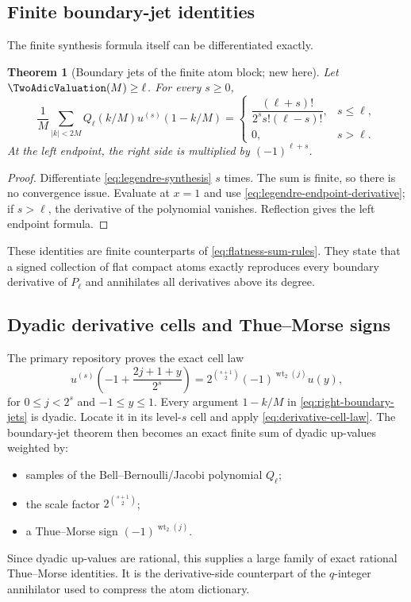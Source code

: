 \documentclass[11pt,oneside]{article}
\numberwithin{equation}{section}
\newtheorem{theorem}{Theorem}[section]
\theoremstyle{definition}
\theoremstyle{remark}
\begin{document}
\subsection{Finite boundary-jet identities}

The finite synthesis formula itself can be differentiated exactly.

\begin{theorem}[Boundary jets of the finite atom block; new here]
\label{thm:boundary-jets}
Let $\TwoAdicValuation(M)\ge\ell$.  For every $s\ge0$,
\begin{equation}
 \boxed{
 \frac1M\sum_{|k|<2M}Q_\ell(k/M)u^{(s)}(1-k/M)
 =
 \begin{cases}
 \dfrac{(\ell+s)!}{2^ss!(\ell-s)!},&s\le\ell,\\[0.7em]
 0,&s>\ell.
 \end{cases}}
 \label{eq:right-boundary-jets}
\end{equation}
At the left endpoint, the right side is multiplied by $(-1)^{\ell+s}$.
\end{theorem}

\begin{proof}
Differentiate \eqref{eq:legendre-synthesis} $s$ times.  The sum is finite, so
there is no convergence issue.  Evaluate at $x=1$ and use
\eqref{eq:legendre-endpoint-derivative}; if $s>\ell$, the derivative of the
polynomial vanishes.  Reflection gives the left endpoint formula.
\end{proof}

These identities are finite counterparts of
\eqref{eq:flatness-sum-rules}.  They state that a signed collection of flat
compact atoms exactly reproduces every boundary derivative of $P_\ell$ and
annihilates all derivatives above its degree.

\subsection{Dyadic derivative cells and Thue--Morse signs}

The primary repository proves the exact cell law
\begin{equation}
 u^{(s)}\!\left(-1+\frac{2j+1+y}{2^s}\right)
 =2^{\binom{s+1}{2}}(-1)^{\operatorname{wt}_2(j)}u(y),
 \label{eq:derivative-cell-law}
\end{equation}
for $0\le j<2^s$ and $-1\le y\le1$.  Every argument
$1-k/M$ in \eqref{eq:right-boundary-jets} is dyadic.  Locate it in its level-$s$
cell and apply \eqref{eq:derivative-cell-law}.  The boundary-jet theorem then
becomes an exact finite sum of dyadic up-values weighted by:
\begin{itemize}
  \item samples of the Bell--Bernoulli/Jacobi polynomial $Q_\ell$;
  \item the scale factor $2^{\binom{s+1}{2}}$;
  \item a Thue--Morse sign $(-1)^{\operatorname{wt}_2(j)}$.
\end{itemize}
Since dyadic up-values are rational, this supplies a large family of exact
rational Thue--Morse identities.  It is the derivative-side counterpart of
the $q$-integer annihilator used to compress the atom dictionary.
\end{document}
